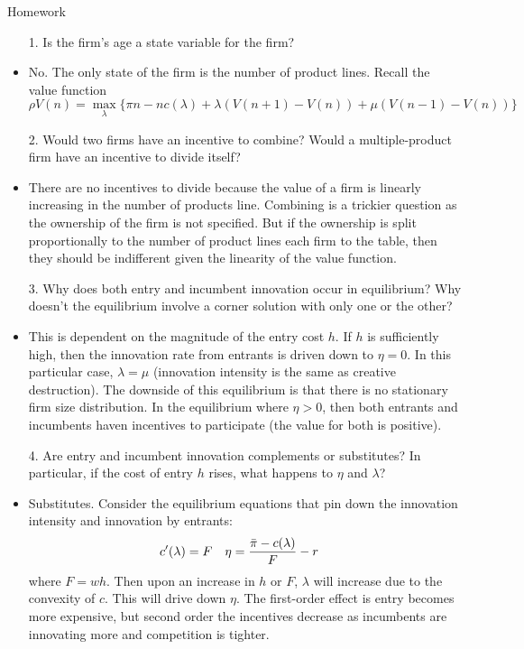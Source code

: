 \documentclass[usenames,dvipsnames,aspectratio=169]{beamer}
\begin{document}
\begin{frame}[allowframebreaks]{Homework}
    \begin{itemize}
    \vspace{15pt}
        \item[1.] Is the firm's age a state variable for the firm? \\ 
        \item No. The only state of the firm is the number of product lines. Recall the value function
        \begin{equation*}
            \rho V(n) = \max_{\lambda}\Big\{ \pi n - nc(\lambda) + \lambda\left(V(n+1)-V(n)\right) + \mu\left( V(n-1)-V(n)\right)\Big\}
        \end{equation*}
        \vfill
        \item[2.] Would two firms have an incentive to combine?  Would a multiple-product firm have an incentive to divide itself? 
        \item There are no incentives to divide because the value of a firm is linearly increasing in the number of products line. Combining is a trickier question as the ownership of the firm is not specified. But if the ownership is split proportionally to the number of product lines each firm to the table, then they should be indifferent given the linearity of the value function. 
        \vspace{15pt}
        \framebreak
        
        \item[3.] Why does both entry and incumbent innovation occur in equilibrium?  Why doesn't the equilibrium involve a corner solution with only one or the other? \\ 
        \item This is dependent on the magnitude of the entry cost $h$. If $h$ is sufficiently high, then the innovation rate from entrants is driven down to $\eta=0$. In this particular case, $\lambda=\mu$ (innovation intensity is the same as creative destruction). The downside of this equilibrium is that there is no stationary firm size distribution. In the equilibrium where $\eta>0$, then both entrants and incumbents haven incentives to participate (the value for both is positive).
         \vspace{40pt}
        \framebreak
        \item[4.] Are entry and incumbent innovation complements or substitutes?  In particular, if the cost of entry $h$ rises, what happens to $\eta$ and $\lambda$? \\ 
        \item Substitutes. Consider the equilibrium equations that  pin down the innovation intensity and innovation by entrants:
        \begin{align*}
            c'(\lambda) &= F & \eta &= \frac{\Bar{\pi}-c(\lambda)}{F}-r
        \end{align*}
        where $F=wh$. Then upon an increase in $h$ or $F$, $\lambda$ will increase due to the convexity of $c$. This will drive down $\eta$. The first-order effect is entry becomes more expensive, but second order the incentives decrease as incumbents are innovating more and competition is tighter. 
    \end{itemize}
\end{frame}
\end{document}
